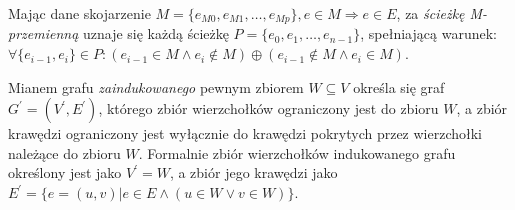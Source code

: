 \begin{definition}
  Mając dane skojarzenie ${M=\{e_{M0}, e_{M1}, \ldots, e_{Mp}\}, e \in M \Rightarrow e \in E}$,
  za \emph{ścieżkę M-przemienną} uznaje się każdą ścieżkę $P=\{e_0, e_1, \ldots,
  e_{n-1}\}$, spełniającą warunek: 
  ${\forall{\{e_{i-1}, e_i\} \in P}: (e_{i-1} \in M \land e_{i} \notin M) \oplus
  (e_{i-1} \notin M \land e_{i} \in M)}$.
\end{definition}

\begin{definition}
  Mianem grafu \emph{zaindukowanego} pewnym zbiorem $W \subseteq V$ określa się graf $G^\prime=(V^\prime, E^\prime)$, którego zbiór wierzchołków ograniczony jest do zbioru $W$, a zbiór krawędzi ograniczony jest wyłącznie do krawędzi pokrytych przez wierzchołki należące do zbioru $W$.
  Formalnie zbiór wierzchołków indukowanego grafu określony jest jako $V^\prime = W$, a zbiór jego krawędzi jako $E^\prime=\{e=(u,v)|e\in E \land (u \in W \lor v \in W)\}$.
\end{definition}
